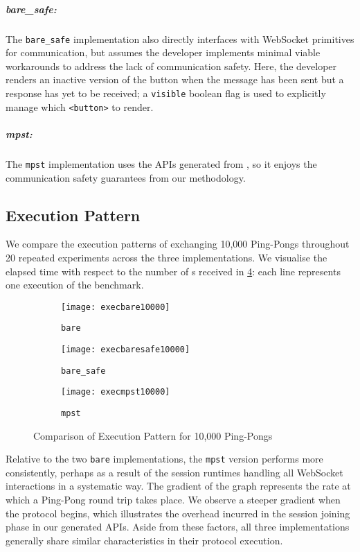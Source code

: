 \subparagraph{bare_safe:}
The \texttt{bare_safe} implementation also directly interfaces with
WebSocket primitives for communication, but assumes the developer
implements minimal viable workarounds to address the lack of
communication safety. Here, the developer renders an inactive version
of the  button when the  message has been sent
but a response has yet to be received; a \texttt{visible} boolean flag
is used to explicitly manage which \texttt{<button>} to render.

\subparagraph{mpst:}
The \texttt{mpst} implementation uses the APIs generated from 
, so it enjoys the
communication safety guarantees from our methodology.

\subsection{Execution Pattern}
\label{section:execpattern}

We compare the execution patterns of exchanging 10,000 Ping-Pongs
throughout 20 repeated experiments across the three implementations.
We visualise the elapsed time with respect to the number of s
received in \cref{fig:execution}: each line represents one
execution of the benchmark.

\begin{figure}[!ht]
\centering
\begin{subfigure}[b]{0.49\textwidth}
\centering
\texttt{[image: execbare10000]}
\caption{\texttt{bare}}
\label{fig:executionbare}
\end{subfigure}
\hfill
\begin{subfigure}[b]{0.49\textwidth}
\centering
\texttt{[image: execbaresafe10000]}
\caption{\texttt{bare_safe}}
\label{fig:executionbaresafe}
\end{subfigure}
\hfill
\begin{subfigure}[b]{0.49\textwidth}
\centering
\texttt{[image: execmpst10000]}
\caption{\texttt{mpst}}
\label{fig:executionmpst}
\end{subfigure}
\caption{Comparison of Execution Pattern for 10,000 Ping-Pongs}
\label{fig:execution}
\end{figure}

Relative to the two \texttt{bare} implementations, the
\texttt{mpst} version performs more consistently, perhaps as a result
of the session runtimes handling all WebSocket interactions in a
systematic way. The gradient of the graph represents the rate at which
a Ping-Pong round trip takes place. 
We observe a steeper gradient when the protocol begins, 
which illustrates the overhead incurred in the 
session joining phase in our generated APIs.
Aside from these factors, all three implementations generally share
similar characteristics in their protocol execution.

